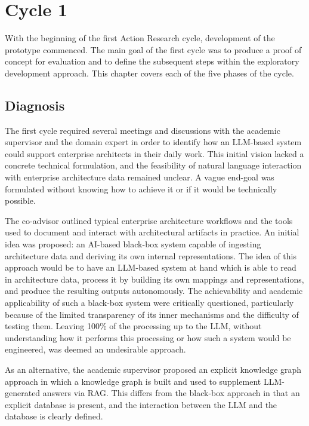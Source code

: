 \chapter{Cycle 1}
\label{ch:cycle1}
With the beginning of the first Action Research cycle, development of the prototype commenced. The main goal of the first cycle was to produce a proof of concept for evaluation and to define the subsequent steps within the exploratory development approach. This chapter covers each of the five phases of the cycle.

\section{Diagnosis}
\label{sec:cycle1_diagnosis}
The first cycle required several meetings and discussions with the academic supervisor and the domain expert in order to identify how an LLM-based system could support enterprise architects in their daily work. This initial vision lacked a concrete technical formulation, and the feasibility of natural language interaction with enterprise architecture data remained unclear. A vague end-goal was formulated without knowing how to achieve it or if it would be technically possible.

The co-advisor outlined typical enterprise architecture workflows and the tools used to document and interact with architectural artifacts in practice. An initial idea was proposed: an AI-based black-box system capable of ingesting architecture data and deriving its own internal representations. The idea of this approach would be to have an LLM-based system at hand which is able to read in architecture data, process it by building its own mappings and representations, and produce the resulting outputs autonomously. The achievability and academic applicability of such a black-box system were critically questioned, particularly because of the limited transparency of its inner mechanisms and the difficulty of testing them. Leaving 100\% of the processing up to the LLM, without understanding how it performs this processing or how such a system would be engineered, was deemed an undesirable approach.

As an alternative, the academic supervisor proposed an explicit knowledge graph approach in which a knowledge graph is built and used to supplement LLM-generated answers via RAG. This differs from the black-box approach in that an explicit database is present, and the interaction between the LLM and the database is clearly defined.

